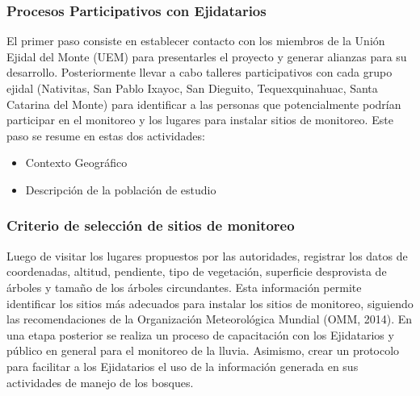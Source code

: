 \subsubsection{Procesos Participativos con Ejidatarios} 
El primer paso consiste en establecer contacto con los miembros de la Unión Ejidal del Monte (UEM) para presentarles el proyecto y generar alianzas para su desarrollo. Posteriormente llevar a cabo talleres participativos con cada grupo ejidal (Nativitas, San Pablo Ixayoc, San Dieguito, Tequexquinahuac, Santa Catarina del Monte) para identificar a las personas que potencialmente podrían participar en el monitoreo y los lugares para instalar sitios de monitoreo. Este paso se resume en estas dos actividades:
\begin{itemize}
  \item Contexto Geográfico
  \item Descripción de la población de estudio
\end{itemize}


\subsubsection*{Criterio de selección de sitios de monitoreo}
Luego de visitar los lugares propuestos por las autoridades, registrar los datos de coordenadas, altitud, pendiente, tipo de vegetación, superficie desprovista de árboles y tamaño de los árboles circundantes. Esta información permite identificar los sitios más adecuados para instalar los sitios de monitoreo, siguiendo las recomendaciones de la Organización Meteorológica Mundial (OMM, 2014). En una etapa posterior se realiza un proceso de capacitación con los Ejidatarios y público en general para el monitoreo de la lluvia. Asimismo, crear un protocolo para facilitar a los Ejidatarios el uso de la información generada en sus actividades de manejo de los bosques.



